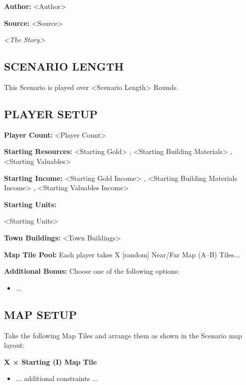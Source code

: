 
\begin{multicols*}{2}

\textbf{Author:} <Author>

\textbf{Source:} <Source>

\textit{<The Story>}

\subsection*{\MakeUppercase{Scenario Length}}

This Scenario is played over <Scenario Length> Rounds.

\subsection*{\MakeUppercase{Player Setup}}

\textbf{Player Count:} <Player Count>

\textbf{Starting Resources:} <Starting Gold> , <Starting Building Materials> , <Starting Valuables> 

\textbf{Starting Income:} <Starting Gold Income> , <Starting Building Materials Income> , <Starting Valuables Income> 

\textbf{Starting Units:}
\begin{itemize}<Starting Units>
\end{itemize}

\textbf{Town Buildings:} <Town Buildings>

\textbf{Map Tile Pool:} Each player takes X [random] Near/Far Map (A--B) Tiles...

\textbf{Additional Bonus:} Choose one of the following options:

\begin{itemize}
    \item ...
\end{itemize}

\subsection*{\MakeUppercase{Map Setup}}

Take the following Map Tiles and arrange them as shown in the Scenario map layout:

  \textbf{X × Starting (I) Map Tile}
\begin{itemize}
    \item ... additional constraints ...
\end{itemize}


\end{multicols*}
